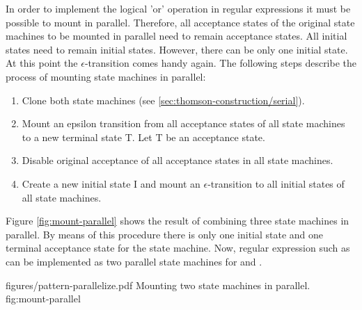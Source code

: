 In order to implement the logical 'or' operation in regular expressions it must
be possible to mount in parallel.  Therefore, all acceptance states of the
original state machines to be mounted in parallel need to remain acceptance
states. All initial states need to remain initial states. However, there can be
only one initial state. At this point the $\epsilon$-transition comes handy
again. The following steps describe the process of mounting state machines in
parallel:

\begin{enumerate}
\item Clone both state machines (see \ref{sec:thomson-construction/serial}).
\item Mount an epsilon transition from all acceptance states of all 
      state machines
      to a new terminal state T. Let T be an acceptance state.
\item Disable original acceptance of all acceptance states in all state machines.
\item Create a new initial state I and mount an $\epsilon$-transition to 
      all initial states of all state machines.
\end{enumerate}

Figure \ref{fig:mount-parallel} shows the result of combining three state
machines in parallel. By means of this procedure there is only one initial
state and one terminal acceptance state for the state machine. Now, regular
expression such as  can be implemented as two parallel
state machines for  and .

\showpic
{figures/pattern-parallelize.pdf}
{Mounting two state machines in parallel.}
{fig:mount-parallel}

